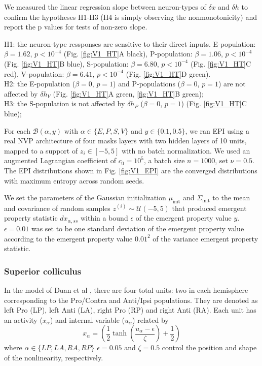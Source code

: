 \documentclass[11pt]{article}
\begin{document}
We measured the linear regression slope between neuron-types of $\delta x$ and $\delta h$ to confirm the hypotheses H1-H3 (H4 is simply observing the nonmonotonicity) and report the p values for tests of non-zero slope.

{\addtolength{\leftskip}{10 mm}
H1: the neuron-type ressponses are sensitive to their direct inputs. 
E-population: $\beta=1.62$, $p<10^{-4}$ (Fig. \ref{fig:V1_HT}A black),
P-population: $\beta=1.06$, $p<10^{-4}$ (Fig. \ref{fig:V1_HT}B blue), S-population: $\beta=6.80$, $p<10^{-4}$  (Fig. \ref{fig:V1_HT}C red), V-population: $\beta=6.41$, $p<10^{-4}$  (Fig. \ref{fig:V1_HT}D green). \\
H2: the E-population ($\beta=0$, $p=1$) and P-populations ($\beta=0$, $p=1$) are not affected by $\delta h_V$ (Fig. \ref{fig:V1_HT}A green, \ref{fig:V1_HT}B green); \\
H3: the S-population is not affected by $\delta h_P$ ($\beta=0$, $p=1$) (Fig. \ref{fig:V1_HT}C blue); \\

}

For each $\mathcal{B}(\alpha, y)$ with $\alpha \in \{E, P, S, V\}$ and $y \in \{0.1, 0.5\}$, we ran EPI using a real NVP architecture of four masks layers with two hidden layers of 10 units,  mapped to a support of $z_i \in \left[-5, 5\right]$ with no batch normalization.  We used an augmented Lagrangian coefficient of $c_0 = 10^5$, a batch size $n=1000$, set $\nu = 0.5$.
The EPI distributions shown in Fig. \ref{fig:V1_EPI} are the converged distributions with maximum entropy across random seeds.

We set the parameters of the Gaussian initialization $\mu_\text{init}$ and $\Sigma_\text{init}$ to the mean and covariance of random samples $z^{(i)} \sim \mathcal{U}(-5, 5)$ that produced emergent property statistic $dx_{\alpha,ss}$ within a bound $\epsilon$ of the emergent property value $y$. $\epsilon=0.01$ was set to be one standard deviation of the emergent property value according to the emergent property value $0.01^2$ of the variance emergent property statistic.  

\subsubsection{Superior colliculus}\label{methods_SC}
In the model of Duan et al \cite{duan2018collicular}, there are four total units: two in each hemisphere corresponding to the Pro/Contra and Anti/Ipsi populations.  They are denoted as left Pro (LP), left Anti (LA), right Pro (RP) and right Anti (RA).  Each unit has an activity ($x_\alpha$) and internal variable ($u_\alpha$) related by
\begin{equation}
x_\alpha =\left(\frac{1}{2}\tanh\left(\frac{u_\alpha - \epsilon}{\zeta}\right)+ \frac{1}{2} \right)
\end{equation}
where $\alpha \in \{LP, LA, RA, RP\}$ $\epsilon = 0.05$ and $\zeta = 0.5$ control the position and shape of the nonlinearity, respectively.
\end{document}
